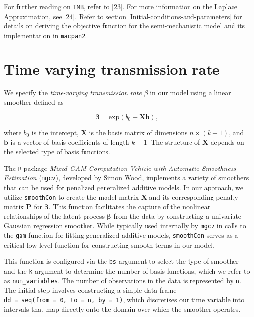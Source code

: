 \documentclass[
11pt, %
oneside, %
english, %
singlespacing, %
]{macthesis} %
\begin{document}
For further reading on \texttt{TMB}, refer to {[}23{]}. For more information on the Laplace Approximation, see {[}24{]}. Refer to section \ref{Initial-conditions-and-parameters} for details on deriving the objective function for the semi-mechanistic model and its implementation in \texttt{macpan2}.

\section{Time varying transmission rate}\label{Time-varying-transmission-rate}

We specify the \emph{time-varying transmission rate} \(\beta\) in our model using a linear smoother defined as

\begin{equation}
\boldsymbol{\beta} = \text{exp}(b_0 + \mathbf{X}\mathbf{b}),
\label{eq:linear smoother}
\end{equation}

where \(b_0\) is the intercept, \(\mathbf{X}\) is the basis matrix of dimensions \(n \times (k-1)\), and \(\mathbf{b}\) is a vector of basis coefficients of length \(k-1\). The structure of \(\mathbf{X}\) depends on the selected type of basis functions.

The \texttt{R} package \emph{Mixed GAM Computation Vehicle with Automatic Smoothness Estimation} (\texttt{mgcv}), developed by Simon Wood, implements a variety of smoothers that can be used for penalized generalized additive models. In our approach, we utilize \texttt{smoothCon} to create the model matrix \(\mathbf{X}\) and its corresponding penalty matrix \(\mathbf{P}\) for \(\boldsymbol{\beta}\). This function facilitates the capture of the nonlinear relationships of the latent process \(\boldsymbol{\beta}\) from the data by constructing a univariate Gaussian regression smoother. While typically used internally by \texttt{mgcv} in calls to the \texttt{gam} function for fitting generalized additive models, \texttt{smoothCon} serves as a critical low-level function for constructing smooth terms in our model.

This function is configured via the \texttt{bs} argument to select the type of smoother and the \texttt{k} argument to determine the number of basis functions, which we refer to as \texttt{num\_variables}. The number of observations in the data is represented by \texttt{n}. The initial step involves constructing a simple data frame \texttt{dd\ =\ seq(from\ =\ 0,\ to\ =\ n,\ by\ =\ 1)}, which discretizes our time variable into intervals that map directly onto the domain over which the smoother operates.
\end{document}
